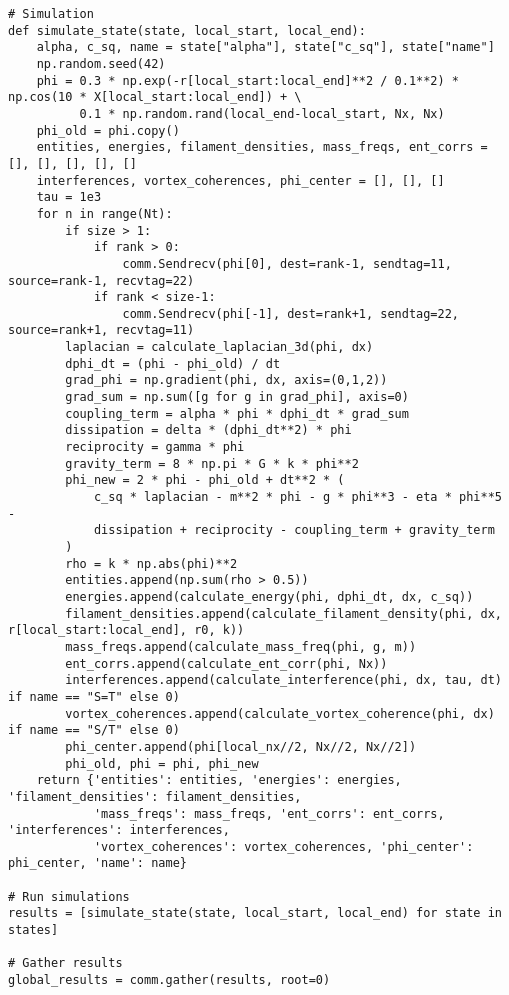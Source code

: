 \documentclass[11pt]{article}
\begin{document}
\begin{lstlisting}
# Simulation
def simulate_state(state, local_start, local_end):
    alpha, c_sq, name = state["alpha"], state["c_sq"], state["name"]
    np.random.seed(42)
    phi = 0.3 * np.exp(-r[local_start:local_end]**2 / 0.1**2) * np.cos(10 * X[local_start:local_end]) + \
          0.1 * np.random.rand(local_end-local_start, Nx, Nx)
    phi_old = phi.copy()
    entities, energies, filament_densities, mass_freqs, ent_corrs = [], [], [], [], []
    interferences, vortex_coherences, phi_center = [], [], []
    tau = 1e3
    for n in range(Nt):
        if size > 1:
            if rank > 0:
                comm.Sendrecv(phi[0], dest=rank-1, sendtag=11, source=rank-1, recvtag=22)
            if rank < size-1:
                comm.Sendrecv(phi[-1], dest=rank+1, sendtag=22, source=rank+1, recvtag=11)
        laplacian = calculate_laplacian_3d(phi, dx)
        dphi_dt = (phi - phi_old) / dt
        grad_phi = np.gradient(phi, dx, axis=(0,1,2))
        grad_sum = np.sum([g for g in grad_phi], axis=0)
        coupling_term = alpha * phi * dphi_dt * grad_sum
        dissipation = delta * (dphi_dt**2) * phi
        reciprocity = gamma * phi
        gravity_term = 8 * np.pi * G * k * phi**2
        phi_new = 2 * phi - phi_old + dt**2 * (
            c_sq * laplacian - m**2 * phi - g * phi**3 - eta * phi**5 - 
            dissipation + reciprocity - coupling_term + gravity_term
        )
        rho = k * np.abs(phi)**2
        entities.append(np.sum(rho > 0.5))
        energies.append(calculate_energy(phi, dphi_dt, dx, c_sq))
        filament_densities.append(calculate_filament_density(phi, dx, r[local_start:local_end], r0, k))
        mass_freqs.append(calculate_mass_freq(phi, g, m))
        ent_corrs.append(calculate_ent_corr(phi, Nx))
        interferences.append(calculate_interference(phi, dx, tau, dt) if name == "S=T" else 0)
        vortex_coherences.append(calculate_vortex_coherence(phi, dx) if name == "S/T" else 0)
        phi_center.append(phi[local_nx//2, Nx//2, Nx//2])
        phi_old, phi = phi, phi_new
    return {'entities': entities, 'energies': energies, 'filament_densities': filament_densities, 
            'mass_freqs': mass_freqs, 'ent_corrs': ent_corrs, 'interferences': interferences, 
            'vortex_coherences': vortex_coherences, 'phi_center': phi_center, 'name': name}

# Run simulations
results = [simulate_state(state, local_start, local_end) for state in states]

# Gather results
global_results = comm.gather(results, root=0)
\end{lstlisting}
\end{document}

